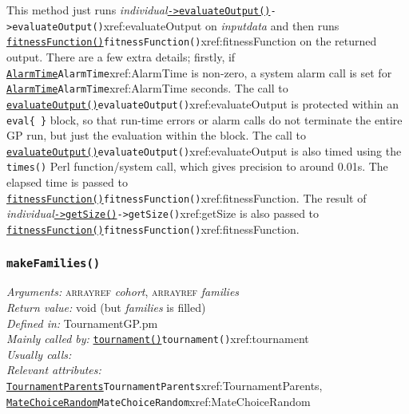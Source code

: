 \documentclass[a4paper]{article}
\begin{document}
This method just runs \textit{individual}\hyperref[no]{\texttt{->evaluateOutput()}}{\texttt{->evaluateOutput()}}{xref:evaluateOutput} on \textit{inputdata}
and then runs \hyperref[no]{\texttt{fitnessFunction()}}{\texttt{fitnessFunction()}}{xref:fitnessFunction} on the returned output.
There are a few extra details; firstly, if \hyperref[no]{\texttt{AlarmTime}}{\texttt{AlarmTime}}{xref:AlarmTime} is
non-zero, a system alarm call is set for \hyperref[no]{\texttt{AlarmTime}}{\texttt{AlarmTime}}{xref:AlarmTime} seconds.
The call to \hyperref[no]{\texttt{evaluateOutput()}}{\texttt{evaluateOutput()}}{xref:evaluateOutput} is protected within an
\texttt{eval\{ \}} block, so that run-time errors or alarm calls do
not terminate the entire GP run, but just the evaluation within the
block.  The call to \hyperref[no]{\texttt{evaluateOutput()}}{\texttt{evaluateOutput()}}{xref:evaluateOutput} is also timed using the
\texttt{times()} Perl function/system call, which gives precision to
around 0.01s.  The elapsed time is passed to
\hyperref[no]{\texttt{fitnessFunction()}}{\texttt{fitnessFunction()}}{xref:fitnessFunction}.  The result of
\textit{individual}\hyperref[no]{\texttt{->getSize()}}{\texttt{->getSize()}}{xref:getSize} is also passed to
\hyperref[no]{\texttt{fitnessFunction()}}{\texttt{fitnessFunction()}}{xref:fitnessFunction}.

\subsubsection{\texttt{makeFamilies()}}\label{xref:makeFamilies}
\begin{flushleft}
\textit{Arguments:} \textsc{arrayref} \textit{cohort}, \textsc{arrayref} \textit{families}\\
\textit{Return value:} void (but \textit{families} is filled)\\
\textit{Defined in:} TournamentGP.pm\\
\textit{Mainly called by:} \hyperref[no]{\texttt{tournament()}}{\texttt{tournament()}}{xref:tournament}\\
\textit{Usually calls:} \\
\textit{Relevant attributes:} \hyperref[no]{\texttt{TournamentParents}}{\texttt{TournamentParents}}{xref:TournamentParents}, \hyperref[no]{\texttt{MateChoiceRandom}}{\texttt{MateChoiceRandom}}{xref:MateChoiceRandom}
\end{flushleft}
\end{document}
